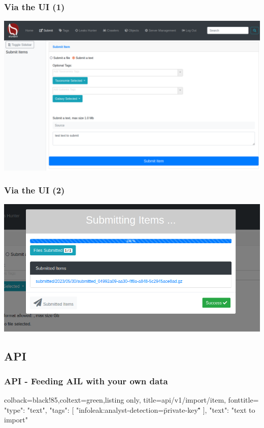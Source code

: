 \documentclass[aspectratio=169]{beamer}
\begin{document}
\begin{frame}
    \frametitle{Via the UI (1)}
    \centerline{\includegraphics[scale=0.20]{screenshot/ui_submit.png}}
\end{frame}

\begin{frame}
    \frametitle{Via the UI (2)}
    \centerline{\includegraphics[scale=0.29]{screenshot/ui_submit0.png}}
\end{frame}

\subsection{API}

\begin{frame}[fragile]
    \frametitle{API - Feeding AIL with your own data}
    \begin{tcblisting}{colback=black!85,coltext=green,listing only,
        title=api/v1/import/item, fonttitle=\bfseries}
{
  "type": "text",
  "tags": [
    "infoleak:analyst-detection=\"private-key\""
  ],
  "text": "text to import"
}
\end{tcblisting}
 
\end{frame}
\end{document}
